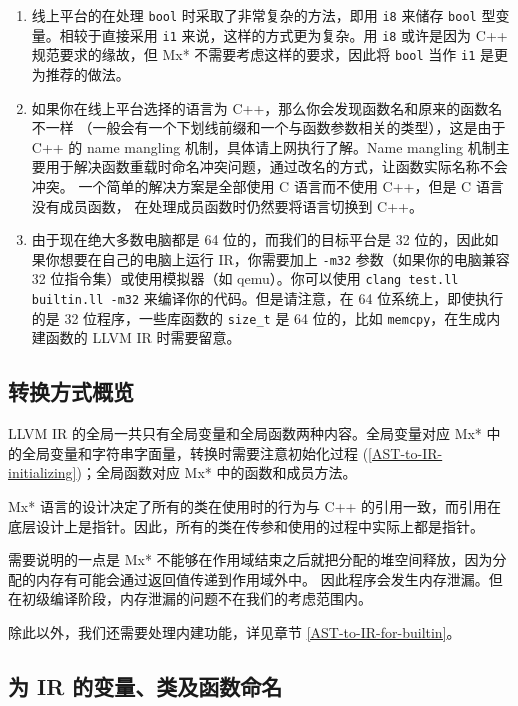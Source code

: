\begin{remark}
\begin{enumerate}
  \item 线上平台的在处理 \texttt{bool} 时采取了非常复杂的方法，即用 \texttt{i8} 来储存
    \texttt{bool} 型变量。相较于直接采用 \texttt{i1} 来说，这样的方式更为复杂。用 \texttt{i8}
    或许是因为 C++ 规范要求的缘故，但 Mx* 不需要考虑这样的要求，因此将 \texttt{bool} 当作
    \texttt{i1} 是更为推荐的做法。
  \item 如果你在线上平台选择的语言为 C++，那么你会发现函数名和原来的函数名不一样
    （一般会有一个下划线前缀和一个与函数参数相关的类型），这是由于
    C++ 的 name mangling 机制，具体请上网执行了解。Name mangling
    机制主要用于解决函数重载时命名冲突问题，通过改名的方式，让函数实际名称不会冲突。
    一个简单的解决方案是全部使用 C 语言而不使用 C++，但是 C 语言没有成员函数，
    在处理成员函数时仍然要将语言切换到 C++。
  \item 由于现在绝大多数电脑都是 64 位的，而我们的目标平台是 32
    位的，因此如果你想要在自己的电脑上运行 IR，你需要加上 \texttt{-m32} 参数（如果你的电脑兼容
    32 位指令集）或使用模拟器（如 qemu）。你可以使用 \texttt{clang test.ll builtin.ll -m32}
    来编译你的代码。但是请注意，在 64 位系统上，即使执行的是 32 位程序，一些库函数的
    \texttt{size\_t} 是 64 位的，比如 \texttt{memcpy}，在生成内建函数的 LLVM IR 时需要留意。
\end{enumerate}
\end{remark}

\subsection{转换方式概览}\label{AST-to-IR-details}

LLVM IR 的全局一共只有全局变量和全局函数两种内容。全局变量对应 Mx*
中的全局变量和字符串字面量，转换时需要注意初始化过程
(\ref{AST-to-IR-initializing})；全局函数对应 Mx* 中的函数和成员方法。

Mx* 语言的设计决定了所有的类在使用时的行为与 C++
的引用一致，而引用在底层设计上是指针。因此，所有的类在传参和使用的过程中实际上都是指针。

需要说明的一点是 Mx* 不能够在作用域结束之后就把分配的堆空间释放，因为分配的内存有可能会通过返回值传递到作用域外中。
因此程序会发生内存泄漏。但在初级编译阶段，内存泄漏的问题不在我们的考虑范围内。

除此以外，我们还需要处理内建功能，详见章节
\ref{AST-to-IR-for-builtin}。

\subsection{为 IR 的变量、类及函数命名}\label{AST-to-IR-naming}

